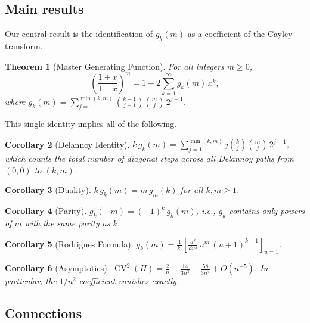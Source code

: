 \documentclass[11pt]{amsart}
\newtheorem{theorem}{Theorem}[section]
\newtheorem{corollary}[theorem]{Corollary}
\theoremstyle{definition}
\DeclareMathOperator{\CV}{CV}
\begin{document}
\subsection{Main results}

Our central result is the identification of $g_k(m)$ as a coefficient of the Cayley transform.

\begin{theorem}[Master Generating Function]\label{thm:master}
For all integers $m \geq 0$,
\[
\left(\frac{1+x}{1-x}\right)^m = 1 + 2\sum_{k=1}^{\infty} g_k(m)\, x^k,
\]
where $g_k(m) = \sum_{j=1}^{\min(k,m)} \binom{k-1}{j-1}\binom{m}{j}\, 2^{j-1}$.
\end{theorem}

This single identity implies all of the following.

\begin{corollary}[Delannoy Identity]\label{cor:delannoy}
$k\, g_k(m) = \sum_{j=1}^{\min(k,m)} j\binom{k}{j}\binom{m}{j}\, 2^{j-1}$, which counts the total number of diagonal steps across all Delannoy paths from $(0,0)$ to $(k,m)$.
\end{corollary}

\begin{corollary}[Duality]\label{cor:duality}
$k\, g_k(m) = m\, g_m(k)$ for all $k, m \geq 1$.
\end{corollary}

\begin{corollary}[Parity]\label{cor:parity}
$g_k(-m) = (-1)^k\, g_k(m)$, i.e., $g_k$ contains only powers of $m$ with the same parity as $k$.
\end{corollary}

\begin{corollary}[Rodrigues Formula]\label{cor:rodrigues}
$g_k(m) = \frac{1}{k!}\left[\frac{d^k}{du^k}\, u^m\,(u+1)^{k-1}\right]_{u=1}$.
\end{corollary}

\begin{corollary}[Asymptotics]\label{cor:asymptotics}
$\CV^2(H) = \frac{2}{n} - \frac{14}{3n^3} - \frac{58}{3n^4} + O(n^{-5})$.
In particular, the $1/n^2$ coefficient vanishes exactly.
\end{corollary}

\subsection{Connections}
\end{document}

